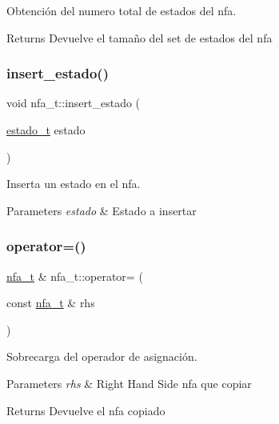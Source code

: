 Obtención del numero total de estados del nfa. 

\begin{DoxyReturn}{Returns}
Devuelve el tamaño del set de estados del nfa 
\end{DoxyReturn}
\mbox{\label{classnfa__t_aef9354648195e1b8673e4cf74a8d8f24}} 
\subsubsection{\texorpdfstring{insert\+\_\+estado()}{insert\_estado()}}
{\footnotesize\ttfamily void nfa\+\_\+t\+::insert\+\_\+estado (\begin{DoxyParamCaption}\item[{\hyperlink{classestado__t}{estado\+\_\+t}}]{estado }\end{DoxyParamCaption})}



Inserta un estado en el nfa. 


\begin{DoxyParams}{Parameters}
{\em estado} & Estado a insertar \\
\hline
\end{DoxyParams}
\mbox{\label{classnfa__t_af599a01efe013fcfd1dea6af1c6f974a}} 
\subsubsection{\texorpdfstring{operator=()}{operator=()}}
{\footnotesize\ttfamily \hyperlink{classnfa__t}{nfa\+\_\+t} \& nfa\+\_\+t\+::operator= (\begin{DoxyParamCaption}\item[{const \hyperlink{classnfa__t}{nfa\+\_\+t} \&}]{rhs }\end{DoxyParamCaption})}



Sobrecarga del operador de asignación. 


\begin{DoxyParams}{Parameters}
{\em rhs} & Right Hand Side nfa que copiar \\
\hline
\end{DoxyParams}
\begin{DoxyReturn}{Returns}
Devuelve el nfa copiado 
\end{DoxyReturn}
\mbox{\label{classnfa__t_a5095044b6e4ad903c079254cb6db86ee}} 
